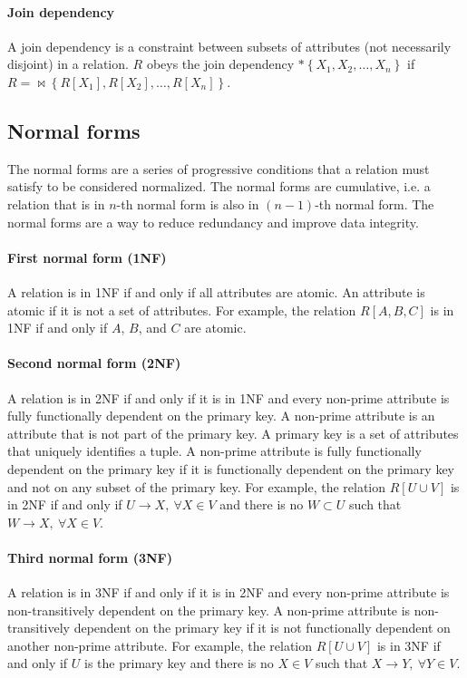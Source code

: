 \paragraph{Join dependency}  A join dependency is a constraint between subsets of
attributes (not necessarily disjoint) in a relation.  $R$ obeys the join dependency $*
\left\{ X_1, X_2, \dots, X_n \right\}$ if $R = {\bowtie \left\{ R[X_1], R[X_2], \dots,
R[X_n] \right\}}$.

\subsection{Normal forms}

The normal forms are a series of progressive conditions that a relation must satisfy to
be considered normalized.  The normal forms are cumulative, i.e. a relation that is in
$n$-th normal form is also in $(n-1)$-th normal form.  The normal forms are a way to
reduce redundancy and improve data integrity.

\paragraph{First normal form (1NF)}  A relation is in 1NF if and only if all attributes
are atomic.  An attribute is atomic if it is not a set of attributes.  For example, the
relation $R[A, B, C]$ is in 1NF if and only if $A$, $B$, and $C$ are atomic.

\paragraph{Second normal form (2NF)}  A relation is in 2NF if and only if it is in 1NF
and every non-prime attribute is fully functionally dependent on the primary key.  A
non-prime attribute is an attribute that is not part of the primary key.  A primary key
is a set of attributes that uniquely identifies a tuple.  A non-prime attribute is fully
functionally dependent on the primary key if it is functionally dependent on the primary
key and not on any subset of the primary key.  For example, the relation $R[U \cup V]$ is
in 2NF if and only if $U \to X,~\forall X \in V$ and there is no $W \subset U$ such that
$W \to X,~\forall X \in V$.

\paragraph{Third normal form (3NF)}  A relation is in 3NF if and only if it is in 2NF
and every non-prime attribute is non-transitively dependent on the primary key.  A
non-prime attribute is non-transitively dependent on the primary key if it is not
functionally dependent on another non-prime attribute.  For example, the relation $R[U
\cup V]$ is in 3NF if and only if $U$ is the primary key and there is no $X \in V$ such
that $X \to Y,~\forall Y \in V$.


